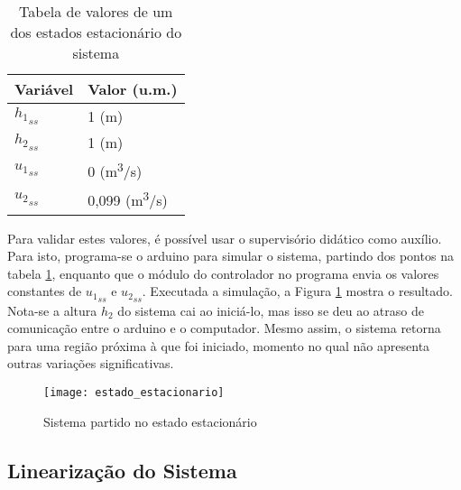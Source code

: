\begin{table}[htb]
	\centering
	\caption{Tabela de valores de um dos estados estacionário do sistema}
	\begin{tabular} {|m{5em} m{8em}|}
		\hline
		Variável & Valor (u.m.) \\
		\hline
		${h_1}_{ss}$ & 1 (m) \\
		${h_2}_{ss}$ & 1 (m) \\
		${u_1}_{ss}$ & 0 (m\textsuperscript{3}/s) \\
		${u_2}_{ss}$ & 0,099 (m\textsuperscript{3}/s)\\
		\hline
	\end{tabular}
	\label{tbl_ss}
\end{table}

Para validar estes valores, é possível usar o supervisório didático como auxílio. Para isto, programa-se o arduino para simular o sistema, partindo dos pontos na tabela \ref{tbl_ss}, enquanto que o módulo do controlador no programa envia os valores constantes de ${u_1}_{ss}$ e ${u_2}_{ss}$. Executada a simulação, a Figura \ref{img_ss} mostra o resultado. Nota-se a altura $h_2$ do sistema cai ao iniciá-lo, mas isso se deu ao atraso de comunicação entre o arduino e o computador. Mesmo assim, o sistema retorna para uma região próxima à que foi iniciado, momento no qual não apresenta outras variações significativas.

\begin{figure}[htb]
	\centering
	\caption{Sistema partido no estado estacionário}
	\texttt{[image: estado\_estacionario]}
	\label{img_ss}
\end{figure}

\subsection{Linearização do Sistema}

